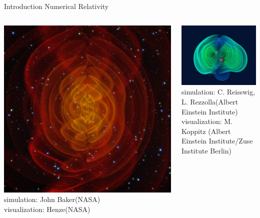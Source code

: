 \documentclass[xcolor=dvipsnames]{beamer}
\begin{document}
	\begin{frame}{Introduction}
		Numerical Relativity
		\begin{columns}[c]
			\column{2in}
			\begin{center}
				\includegraphics[scale=0.07]{nr-baker.jpg}\\
				\tiny{simulation: John Baker(NASA)}\\
				\tiny{visualization: Henze(NASA)}
			\end{center}
			\column{2in}
			\begin{center}
				\includegraphics[scale=0.5]{nr-mpg.jpg}\\
				\tiny{simulation: C. Reisswig, L. Rezzolla(Albert Einstein Institute)}\\
				\tiny{visualization: M. Koppitz (Albert Einstein Institute/Zuse Institute Berlin)}
			\end{center}
		\end{columns}		
	\end{frame}
\end{document}
